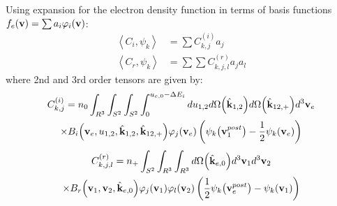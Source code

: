 \documentclass{article}[draft]
\begin{document}
Using expansion for the electron density function in terms of basis functions
$f_e\of{\vect{v}} = \sum a_i \varphi_i\of{\vect{v}}$:
\begin{align*}
\left< C_i, \psi_k \right> 
&= \sum C^{(i)}_{k,j} a_j 
\\
\left< C_r, \psi_k \right> 
&= \sum \sum C^{(r)}_{k,j,l} a_j a_l
\end{align*}
where 2nd and 3rd order tensors are given by:
\begin{multline*}
C^{(i)}_{k,j} = 
n_0
\int_{R^3} 
\int_{S^2} \int_{S^2} \int_{0}^{u_{e,0} - \Delta E_i} 
d u_{1,2} d\Omega\of{\hat{\vect{k}}_{1,2}} d\Omega\of{\hat{\vect{k}}_{12,+}} d^3 \vect{v}_e
\\
\times B_i\of{\vect{v}_e, u_{1,2}, \hat{\vect{k}}_{1,2}, \hat{\vect{k}}_{12,+}} \varphi_{j} \of{\vect{v}_e} 
\left( \psi_k\of{\vect{v}_1^{post}}  
- \frac12 \psi_k\of{\vect{v}_e} \right)
\end{multline*}
\begin{multline*}
C^{(r)}_{k,j,l}  =
n_+
\int_{S^2} 
\int_{R^3} \int_{R^3} 
d \Omega\of{\hat{\vect{k}}_{e,0}}
d^3 \vect{v}_1 d^3 \vect{v}_2 
\\
\times B_r\of{\vect{v}_1, \vect{v}_2, \hat{\vect{k}}_{e,0}}
\varphi_{j}\of{\vect{v}_1}  \varphi_{l}\of{\vect{v}_2} 
\left( \frac12 \psi_k\of{\vect{v}_e^{post}}
- \psi_k\of{\vect{v}_1} \right)
\end{multline*}
\end{document}
